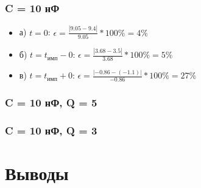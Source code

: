 \subsubsection{C = 10 нФ}
\begin{itemize}
\item[] а) $t = 0$: $\epsilon = \frac{| 9.05 - 9.4 |}{ 9.05 } * 100\% = 4 \%$

\item[] б) $t = t_\text{имп} - 0$: $\epsilon = \frac{| 3.68 - 3.5 |}{ 3.68 } * 100\% = 5 \%$

\item[] в) $t = t_\text{имп} + 0$: $\epsilon = \frac{| -0.86 - (-1.1) |}{ -0.86 } * 100\% = 27 \%$
\end{itemize}

\subsubsection{C = 10 нФ, Q = 5}

\subsubsection{C = 10 нФ, Q = 3}
  
\section{Выводы}



